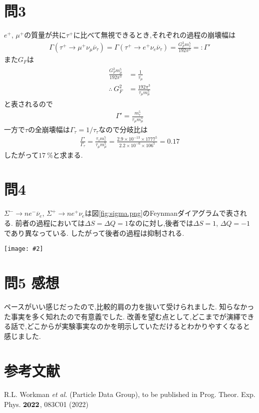 \documentclass[uplatex,a4j,11pt,dvipdfmx]{jsarticle}
\makeatletter
\def\fgcaption{\def\@captype{figure}\caption}
\newcommand{\mfig}[3][width=15cm]{
\begin{center}
\texttt{[image: \#2]}
\fgcaption{#3 \label{fig:#2}}
\end{center}
}
\makeatother
\begin{document}
\section*{問3}
$e^+$, $\mu^+$の質量が共に$\tau^+$に比べて無視できるとき,それぞれの過程の崩壊幅は
\begin{align}
  \Gamma(\tau^+\rightarrow\mu^+\nu_\mu\overline{\nu}_\tau)
  =\Gamma(\tau^+\rightarrow e^+\nu_e\overline{\nu}_\tau)
  =\frac{G_F^2m_\tau^5}{192\pi^3}=:\Gamma'
\end{align}
また$G_F$は
\begin{align}
  \begin{split}
    \frac{G_F^2m_\mu^5}{192\pi^3}&=\frac{1}{\tau_\mu}\\
    \therefore\ G_F^2&=\frac{192\pi^3}{\tau_\mu m_\mu^5}
  \end{split}
\end{align}
と表されるので
\begin{align}
  \Gamma'=\frac{m_\tau^5}{\tau_\mu m_\mu^5}
\end{align}
一方で$\tau$の全崩壊幅は$\Gamma_\tau=1/\tau_\tau$なので分岐比は
\begin{align}
  \frac{\Gamma'}{\Gamma_\tau}=\frac{\tau_\tau m_\tau^5}{\tau_\mu m_\mu^5}=\frac{2.9\times10^{-13}\times1777^5}{2.2\times10^{-6}\times106^5}=0.17
\end{align}
したがって$17\ \%$と求まる.
\section*{問4}
$\Sigma^-\rightarrow ne^-\overline{\nu}_e$,
$\Sigma^+\rightarrow ne^+\nu_e$は図\ref{fig:sigma.png}のFeynmanダイアグラムで表される.
前者の過程においては$\Delta S=\Delta Q=1$なのに対し,後者では$\Delta S=1$, $\Delta Q=-1$であり異なっている.
したがって後者の過程は抑制される.
\mfig[width=14cm]{sigma.png}{$\Sigma^\pm$粒子の崩壊}
\section*{問5 感想}
ペースがいい感じだったので,比較的肩の力を抜いて受けられました.
知らなかった事実を多く知れたので有意義でした.
改善を望む点として,どこまでが演繹できる話で,どこからが実験事実なのかを明示していただけるとわかりやすくなると感じました.
\section*{参考文献}\noindent
[1] R.L. Workman \textit{et al.} (Particle Data Group), to be published in Prog. Theor. Exp. Phys. ${\bf 2022}$, 083C01 (2022)
\end{document}
